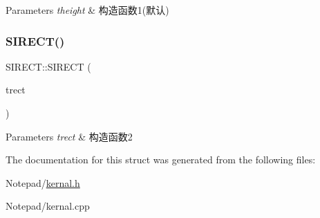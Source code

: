 \begin{DoxyParams}{Parameters}
{\em theight} & 构造函数1(默认) \\
\hline
\end{DoxyParams}
\mbox{\label{struct_s_i_r_e_c_t_ac26d21eb684ef839d9ed8312529da7b6}} 
\subsubsection{\texorpdfstring{S\+I\+R\+E\+C\+T()}{SIRECT()}\hspace{0.1cm}{\footnotesize\ttfamily [2/2]}}
{\footnotesize\ttfamily S\+I\+R\+E\+C\+T\+::\+S\+I\+R\+E\+CT (\begin{DoxyParamCaption}\item[{const \hyperlink{struct_s_i_r_e_c_t}{S\+I\+R\+E\+CT} \&}]{trect }\end{DoxyParamCaption})\hspace{0.3cm}{\ttfamily [inline]}}


\begin{DoxyParams}{Parameters}
{\em trect} & 构造函数2 \\
\hline
\end{DoxyParams}


The documentation for this struct was generated from the following files\+:\begin{DoxyCompactItemize}
\item 
Notepad/\hyperlink{kernal_8h}{kernal.\+h}\item 
Notepad/kernal.\+cpp\end{DoxyCompactItemize}

